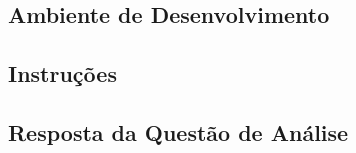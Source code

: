 \subsection{Ambiente de Desenvolvimento}
	

\subsection{Instruções}
	

\subsection{Resposta da Questão de Análise}
	
